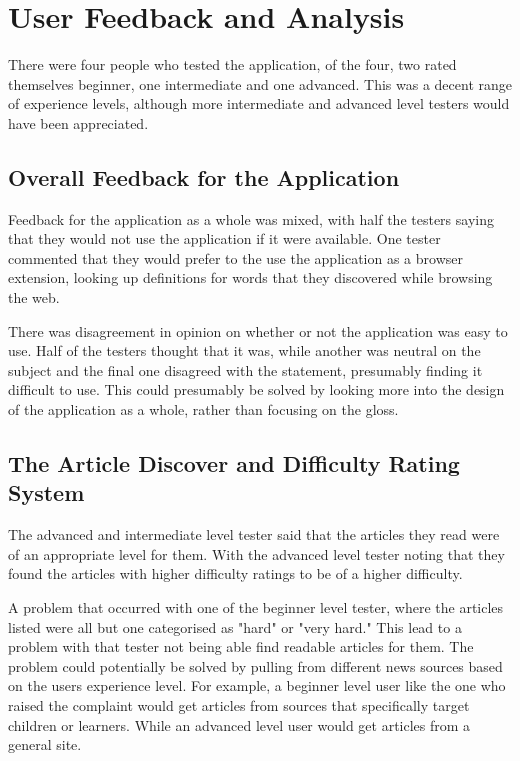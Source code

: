 \section{User Feedback and Analysis}

There were four people who tested the application, of the four, two rated themselves beginner, one intermediate and one advanced. This was a decent range of experience levels, although more intermediate and advanced level testers would have been appreciated.

\subsection{Overall Feedback for the Application}

Feedback for the application as a whole was mixed, with half the testers saying that they would not use the application if it were available. One tester commented that they would prefer to the use the application as a browser extension, looking up definitions for words that they discovered while browsing the web.

There was disagreement in opinion on whether or not the application was easy to use. Half of the testers thought that it was, while another was neutral on the subject and the final one disagreed with the statement, presumably finding it difficult to use. This could presumably be solved by looking more into the design of the application as a whole, rather than focusing on the gloss.


\subsection{The Article Discover and Difficulty Rating System}

The advanced and intermediate level tester said that the articles they read were of an appropriate level for them. With the advanced level tester noting that they found the articles with higher difficulty ratings to be of a higher difficulty. 

A problem that occurred with one of the beginner level tester, where the articles listed were all but one categorised as "hard" or "very hard." This lead to a problem with that tester not being able find readable articles for them. The problem could potentially be solved by pulling from different news sources based on the users experience level. For example, a beginner level user like the one who raised the complaint would get articles from sources that specifically target children or learners. While an advanced level user would get articles from a general site.

